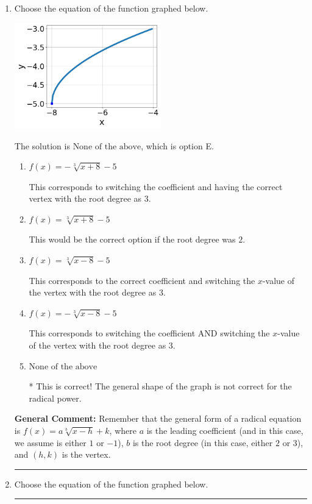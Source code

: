 \documentclass{extbook}[14pt]
\newcommand{\litem}[1]{\item #1

\rule{\textwidth}{0.4pt}}
\begin{document}
\begin{enumerate}\litem{
Choose the equation of the function graphed below.

\begin{center}
    \includegraphics[width=0.5\textwidth]{../Figures/radicalGraphToEquationCopyB.png}
\end{center}



The solution is \( \text{None of the above} \), which is option E.\begin{enumerate}[label=\Alph*.]
\item \( f(x) = - \sqrt[3]{x + 8} - 5 \)

This corresponds to switching the coefficient and having the correct vertex with the root degree as $3$.
\item \( f(x) = \sqrt[3]{x + 8} - 5 \)

This would be the correct option if the root degree was $2$.
\item \( f(x) = \sqrt[3]{x - 8} - 5 \)

This corresponds to the correct coefficient and switching the $x$-value of the vertex with the root degree as $3$.
\item \( f(x) = - \sqrt[3]{x - 8} - 5 \)

This corresponds to switching the coefficient AND switching the $x$-value of the vertex with the root degree as $3$.
\item \( \text{None of the above} \)

* This is correct! The general shape of the graph is not correct for the radical power.
\end{enumerate}

\textbf{General Comment:} Remember that the general form of a radical equation is $ f(x) = a \sqrt[b]{x - h} + k$, where $a$ is the leading coefficient (and in this case, we assume is either $1$ or $-1$), $b$ is the root degree (in this case, either $2$ or $3$), and $(h, k)$ is the vertex.
}
\litem{
Choose the equation of the function graphed below.

}
\end{enumerate}
\end{document}
